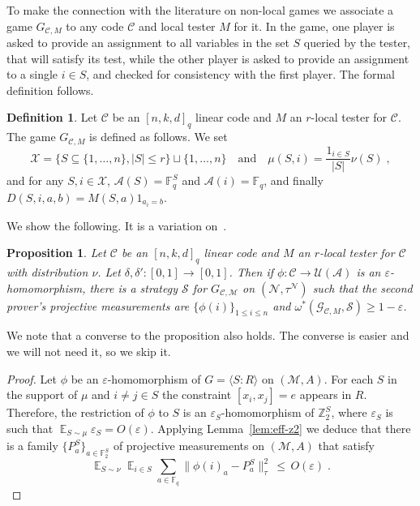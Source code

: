 \documentclass[11pt]{article}
\newtheorem{proposition}[theorem]{Proposition}
\theoremstyle{definition}
\newtheorem{definition}[theorem]{Definition}
\newcommand{\code}{\mathscr{C}}
\newcommand{\strategy}{\mathscr{S}}
\DeclareMathOperator*{\Expectation}{\mathbb{E}}
\newcommand{\Es}[1]{\Expectation_{#1}}
\newcommand{\F}{\ensuremath{\mathbb{F}}}
\newcommand{\Z}{\ensuremath{\mathbb{Z}}}
\newcommand{\mA}{\ensuremath{\mathcal{A}}}
\newcommand{\mG}{\ensuremath{\mathcal{G}}}
\newcommand{\mM}{\ensuremath{\mathcal{M}}}
\newcommand{\mU}{\ensuremath{\mathcal{U}}}
\newcommand{\mX}{\ensuremath{\mathcal{X}}}
\newcommand{\eps}{\varepsilon}
\newcommand{\mN}{\mathcal{N}}
\newcommand{\G}{\mG}
\begin{document}
To make the connection with the literature on non-local games we associate a game $G_{\code,M}$ to any code $\code$ and local tester $M$ for it. In the game, one player is asked to provide an assignment to all variables in the set $S$ queried by the tester, that will satisfy its test, while the other player is asked to provide an assignment to a single $i\in S$, and checked for consistency with the first player. The formal definition follows.  

\begin{definition}
Let $\code$ be an $[n,k,d]_q$ linear code and $M$ an $r$-local tester for $\code$. The game $G_{\code,M}$ is defined as follows. We set 
\[\mX = \{ S\subseteq \{1,\ldots,n\},|S|\leq r\} \sqcup\{1,\ldots,n\}\quad\text{and}\quad \mu(S,i)=\frac{1_{i\in S}}{|S|}\nu(S)\;,\]
and for any $S,i\in\mX$, $\mA(S)=\F_q^S$ and $\mA(i)=\F_q$, and finally $D(S,i,a,b)=M(S,a)1_{a_i=b}$. 
\end{definition}

We show the following. It is a variation on~\cite[Proposition 3.4]{slofstra2019set}.

\begin{proposition}\label{prop:sound-game}
Let $\code$ be an $[n,k,d]_q$ linear code and $M$ an $r$-local tester for $\code$ with distribution $\nu$. Let $\delta,\delta':[0,1]\to[0,1]$. Then if $\phi:\code\to \mU(\mA)$ is an $\eps$-homomorphism, there is a strategy $\strategy$ for $G_{\code,\mM}$ on $(\mN,\tau^\mN)$ such that the second prover's projective measurements are $\{\phi(i)\}_{1\leq i \leq n}$ and $\omega^*(\G_{\code,M},\strategy)\geq 1-\eps$. 
\end{proposition}

We note that a converse to the proposition also holds. The converse is easier and we will not need it, so we skip it. 

\begin{proof}
Let $\phi$ be an $\eps$-homomorphism of $G=\langle S:R\rangle$ on $(\mM,A)$. For each $S$ in the support of $\mu$ and $i\neq j \in S$ the constraint $[x_i,x_j]=e$ appears in $R$. Therefore, the restriction of $\phi$ to $S$ is an $\eps_S$-homomorphism of $\Z_2^S$, where $\eps_S$ is such that $\Es{S\sim \mu} \eps_S = O(\eps)$. Applying Lemma~\ref{lem:eff-z2} we deduce that there is a family $\{P^S_a\}_{a\in \F_2^S}$ of projective measurements on $(\mM,A)$ that satisfy 
\[ \Es{S \sim \nu} \Es{i\in S} \sum_{a \in \F_q} \big\| \phi(i)_a - P^S_a \big\|_\tau^2  \,\leq\,O(\eps)\;.\]
\end{proof}
\end{document}
